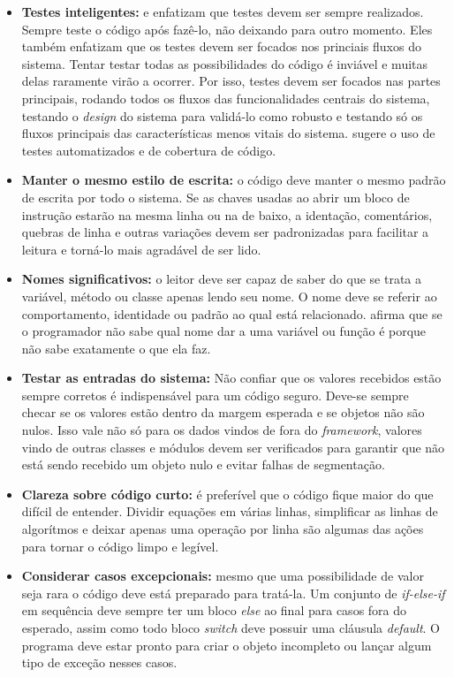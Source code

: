 \begin{itemize}
  \item \textbf{Testes inteligentes:} \cite{Goodliffe2007} e \cite{McConnel2004} enfatizam que testes devem ser sempre realizados. Sempre teste o código após fazê-lo, não deixando para outro momento. Eles também enfatizam que os testes devem ser focados nos princiais fluxos do sistema. Tentar testar todas as possibilidades do código é inviável e muitas delas raramente virão a ocorrer. Por isso, testes devem ser focados nas partes principais, rodando todos os fluxos das funcionalidades centrais do sistema, testando o \textit{design} do sistema para validá-lo como robusto e testando só os fluxos principais das características menos vitais do sistema. \cite{McConnel2004} sugere o uso de testes automatizados e de cobertura de código.
  \item \textbf{Manter o mesmo estilo de escrita:} o código deve manter o mesmo padrão de escrita por todo o sistema. Se as chaves usadas ao abrir um bloco de instrução estarão na mesma linha ou na de baixo, a identação, comentários, quebras de linha e outras variações devem ser padronizadas para facilitar a leitura e torná-lo mais agradável de ser lido.
  \item \textbf{Nomes significativos:} o leitor deve ser capaz de saber do que se trata a variável, método ou classe apenas lendo seu nome. O nome deve se referir ao comportamento, identidade ou padrão ao qual está relacionado. \cite{Goodliffe2007} afirma que se o programador não sabe qual nome dar a uma variável ou função é porque não sabe exatamente o que ela faz.
  \item \textbf{Testar as entradas do sistema:} Não confiar que os valores recebidos estão sempre corretos é indispensável para um código seguro. Deve-se sempre checar se os valores estão dentro da margem esperada e se objetos não são nulos. Isso vale não só para os dados vindos de fora do \textit{framework}, valores vindo de outras classes e módulos devem ser verificados para garantir que não está sendo recebido um objeto nulo e evitar falhas de segmentação.
  \item \textbf{Clareza sobre código curto:} é preferível que o código fique maior do que difícil de entender. Dividir equações em várias linhas, simplificar as linhas de algorítmos e deixar apenas uma operação por linha são algumas das ações para tornar o código limpo e legível.
  \item \textbf{Considerar casos excepcionais:} mesmo que uma possibilidade de valor seja rara o código deve está preparado para tratá-la. Um conjunto de \textit{if-else-if} em sequência deve sempre ter um bloco \textit{else} ao final para casos fora do esperado, assim como todo bloco \textit{switch} deve possuir uma cláusula \textit{default}. O programa deve estar pronto para criar o objeto incompleto ou lançar algum tipo de exceção nesses casos.

\end{itemize}
